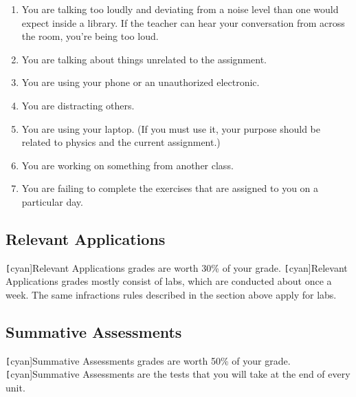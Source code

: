 \documentclass{article}
\begin{document}
\begin{enumerate}
\setlength\itemsep{0.1ex}
    \item You are talking too loudly and deviating from a noise level than one would expect inside a library. If the teacher can hear your conversation from across the room, you're being too loud.
    \item You are talking about things unrelated to the assignment.
    \item You are using your phone or an unauthorized electronic.
    \item You are distracting others.
    \item You are using your laptop. (If you must use it, your purpose should be related to physics and the current assignment.)
    \item You are working on something from another class.
    \item You are failing to complete the exercises that are assigned to you on a particular day.
\end{enumerate}

\subsection{Relevant Applications}
\texttt[cyan]{Relevant Applications} grades are worth 30\% of your grade. \texttt[cyan]{Relevant Applications} grades mostly consist of labs, which are conducted about once a week. The same infractions rules described in the section above apply for labs.

\subsection{Summative Assessments}
\texttt[cyan]{Summative Assessments} grades are worth 50\% of your grade. \texttt[cyan]{Summative Assessments} are the tests that you will take at the end of every unit. 
\end{document}
